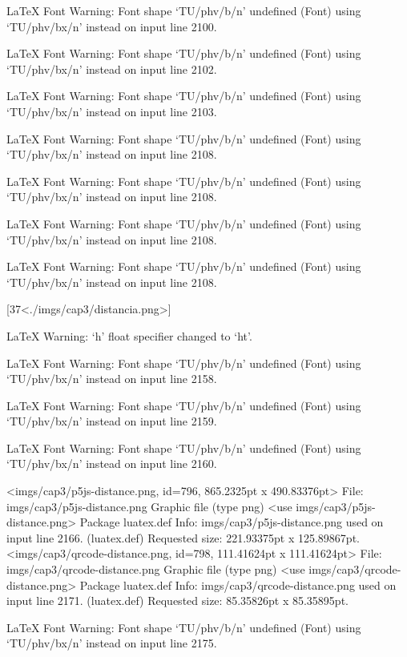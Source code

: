 LaTeX Font Warning: Font shape `TU/phv/b/n' undefined
(Font)              using `TU/phv/bx/n' instead on input line 2100.


LaTeX Font Warning: Font shape `TU/phv/b/n' undefined
(Font)              using `TU/phv/bx/n' instead on input line 2102.


LaTeX Font Warning: Font shape `TU/phv/b/n' undefined
(Font)              using `TU/phv/bx/n' instead on input line 2103.


LaTeX Font Warning: Font shape `TU/phv/b/n' undefined
(Font)              using `TU/phv/bx/n' instead on input line 2108.


LaTeX Font Warning: Font shape `TU/phv/b/n' undefined
(Font)              using `TU/phv/bx/n' instead on input line 2108.


LaTeX Font Warning: Font shape `TU/phv/b/n' undefined
(Font)              using `TU/phv/bx/n' instead on input line 2108.


LaTeX Font Warning: Font shape `TU/phv/b/n' undefined
(Font)              using `TU/phv/bx/n' instead on input line 2108.

[37<./imgs/cap3/distancia.png>]

LaTeX Warning: `h' float specifier changed to `ht'.


LaTeX Font Warning: Font shape `TU/phv/b/n' undefined
(Font)              using `TU/phv/bx/n' instead on input line 2158.


LaTeX Font Warning: Font shape `TU/phv/b/n' undefined
(Font)              using `TU/phv/bx/n' instead on input line 2159.


LaTeX Font Warning: Font shape `TU/phv/b/n' undefined
(Font)              using `TU/phv/bx/n' instead on input line 2160.

<imgs/cap3/p5js-distance.png, id=796, 865.2325pt x 490.83376pt>
File: imgs/cap3/p5js-distance.png Graphic file (type png)
<use imgs/cap3/p5js-distance.png>
Package luatex.def Info: imgs/cap3/p5js-distance.png  used on input line 2166.
(luatex.def)             Requested size: 221.93375pt x 125.89867pt.
<imgs/cap3/qrcode-distance.png, id=798, 111.41624pt x 111.41624pt>
File: imgs/cap3/qrcode-distance.png Graphic file (type png)
<use imgs/cap3/qrcode-distance.png>
Package luatex.def Info: imgs/cap3/qrcode-distance.png  used on input line 2171.
(luatex.def)             Requested size: 85.35826pt x 85.35895pt.

LaTeX Font Warning: Font shape `TU/phv/b/n' undefined
(Font)              using `TU/phv/bx/n' instead on input line 2175.


